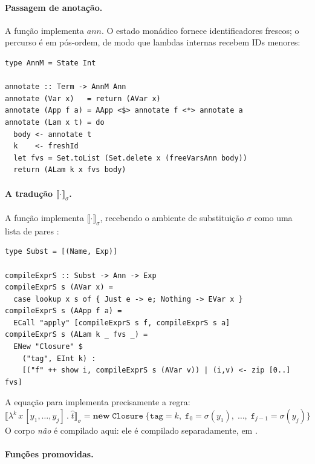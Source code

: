 \paragraph{Passagem de anotação.}

A função  implementa \(\mathit{ann}\). O estado
monádico fornece identificadores frescos; o percurso é em pós-ordem,
de modo que lambdas internas recebem IDs menores:

\begin{verbatim}
type AnnM = State Int

annotate :: Term -> AnnM Ann
annotate (Var x)   = return (AVar x)
annotate (App f a) = AApp <$> annotate f <*> annotate a
annotate (Lam x t) = do
  body <- annotate t
  k    <- freshId
  let fvs = Set.toList (Set.delete x (freeVarsAnn body))
  return (ALam k x fvs body)
\end{verbatim}

\paragraph{A tradução \(\llbracket \cdot \rrbracket_\sigma\).}

A função  implementa \(\llbracket \cdot
\rrbracket_\sigma\), recebendo o ambiente de substituição \(\sigma\)
como uma lista de pares :

\begin{verbatim}
type Subst = [(Name, Exp)]

compileExprS :: Subst -> Ann -> Exp
compileExprS s (AVar x) =
  case lookup x s of { Just e -> e; Nothing -> EVar x }
compileExprS s (AApp f a) =
  ECall "apply" [compileExprS s f, compileExprS s a]
compileExprS s (ALam k _ fvs _) =
  ENew "Closure" $
    ("tag", EInt k) :
    [("f" ++ show i, compileExprS s (AVar v)) | (i,v) <- zip [0..] fvs]
\end{verbatim}

A equação para  implementa precisamente a regra:
\[
  \llbracket \lambda^k\, x\,[y_1,\ldots,y_j]\,.\;\hat{t}
  \rrbracket_\sigma
  = \mathbf{new}\;\mathtt{Closure}\;\{\mathtt{tag}=k,\;
  \mathtt{f}_0=\sigma(y_1),\;\ldots,\;\mathtt{f}_{j-1}=\sigma(y_j)\}
\]
O corpo  \emph{não} é compilado aqui: ele é compilado
separadamente, em .

\paragraph{Funções promovidas.}


